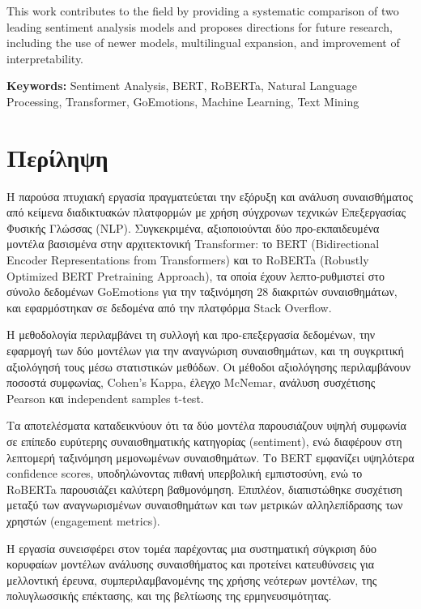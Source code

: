 \documentclass[a4paper,11pt,oneside,openany]{ioniothesis}
\begin{document}
This work contributes to the field by providing a systematic comparison of two leading sentiment analysis models and proposes directions for future research, including the use of newer models, multilingual expansion, and improvement of interpretability.

\vspace{0.8cm}
\noindent\textbf{Keywords:} Sentiment Analysis, BERT, RoBERTa, Natural Language Processing, Transformer, GoEmotions, Machine Learning, Text Mining

\newpage


\section*{Περίληψη}

Η παρούσα πτυχιακή εργασία πραγματεύεται την εξόρυξη και ανάλυση συναισθήματος από κείμενα διαδικτυακών πλατφορμών με χρήση σύγχρονων τεχνικών Επεξεργασίας Φυσικής Γλώσσας (NLP). Συγκεκριμένα, αξιοποιούνται δύο προ-εκπαιδευμένα μοντέλα βασισμένα στην αρχιτεκτονική Transformer: το BERT (Bidirectional Encoder Representations from Transformers) και το RoBERTa (Robustly Optimized BERT Pretraining Approach), τα οποία έχουν λεπτο-ρυθμιστεί στο σύνολο δεδομένων GoEmotions για την ταξινόμηση 28 διακριτών συναισθημάτων, και εφαρμόστηκαν σε δεδομένα από την πλατφόρμα Stack Overflow.

Η μεθοδολογία περιλαμβάνει τη συλλογή και προ-επεξεργασία δεδομένων, την εφαρμογή των δύο μοντέλων για την αναγνώριση συναισθημάτων, και τη συγκριτική αξιολόγησή τους μέσω στατιστικών μεθόδων. Οι μέθοδοι αξιολόγησης περιλαμβάνουν ποσοστά συμφωνίας, Cohen's Kappa, έλεγχο McNemar, ανάλυση συσχέτισης Pearson και independent samples t-test.

Τα αποτελέσματα καταδεικνύουν ότι τα δύο μοντέλα παρουσιάζουν υψηλή συμφωνία σε επίπεδο ευρύτερης συναισθηματικής κατηγορίας (sentiment), ενώ διαφέρουν στη λεπτομερή ταξινόμηση μεμονωμένων συναισθημάτων. Το BERT εμφανίζει υψηλότερα confidence scores, υποδηλώνοντας πιθανή υπερβολική εμπιστοσύνη, ενώ το RoBERTa παρουσιάζει καλύτερη βαθμονόμηση. Επιπλέον, διαπιστώθηκε συσχέτιση μεταξύ των αναγνωρισμένων συναισθημάτων και των μετρικών αλληλεπίδρασης των χρηστών (engagement metrics).

Η εργασία συνεισφέρει στον τομέα παρέχοντας μια συστηματική σύγκριση δύο κορυφαίων μοντέλων ανάλυσης συναισθήματος και προτείνει κατευθύνσεις για μελλοντική έρευνα, συμπεριλαμβανομένης της χρήσης νεότερων μοντέλων, της πολυγλωσσικής επέκτασης, και της βελτίωσης της ερμηνευσιμότητας.
\end{document}
